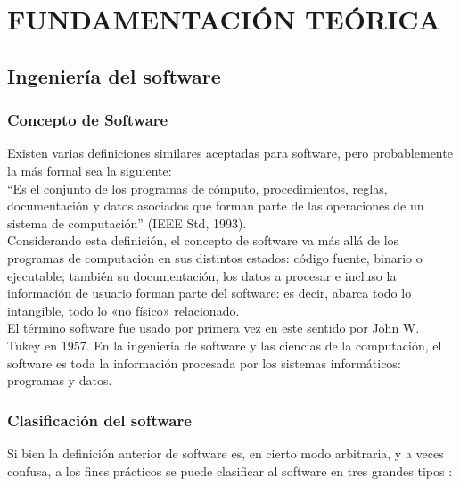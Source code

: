 \documentclass[12pt]{book} %
\begin{document}
		 

\chapter{FUNDAMENTACIÓN TEÓRICA}
\thispagestyle{empty}
\newpage
\section{Ingeniería del software}
	\subsection{Concepto de Software}
		Existen varias definiciones similares aceptadas para software, pero probablemente la más formal sea la siguiente:\\
		
		“Es el conjunto de los programas de cómputo, procedimientos, reglas, documentación y datos asociados que forman parte de las
		operaciones de un sistema de computación” (IEEE Std, 1993).\\
		
		Considerando esta definición, el concepto de software va más allá de los programas de computación en sus distintos estados: 
		código fuente, binario o ejecutable; también su documentación, los datos a procesar e incluso la información de usuario forman
		parte del software: es decir, abarca todo lo intangible, todo lo «no físico» relacionado.\\
		
		El término software fue usado por primera vez en este sentido por John W. Tukey en 1957. En la ingeniería de software y las
		ciencias de la computación, el software es toda la información procesada por los sistemas informáticos: programas y datos.
		
	\subsection{Clasificación del software \label{clasSoft}}
		Si bien la definición anterior de software es, en cierto modo arbitraria, y a veces confusa, a los fines prácticos se puede
		clasificar al software en tres grandes tipos \cite{IngSoft}:
		
\end{document}

